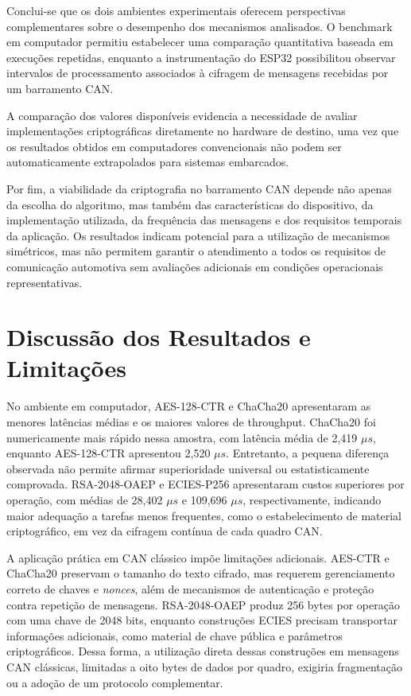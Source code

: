 Conclui-se que os dois ambientes experimentais oferecem perspectivas complementares sobre o desempenho dos mecanismos analisados. O benchmark em computador permitiu estabelecer uma comparação quantitativa baseada em execuções repetidas, enquanto a instrumentação do ESP32 possibilitou observar intervalos de processamento associados à cifragem de mensagens recebidas por um barramento CAN.

A comparação dos valores disponíveis evidencia a necessidade de avaliar implementações criptográficas diretamente no hardware de destino, uma vez que os resultados obtidos em computadores convencionais não podem ser automaticamente extrapolados para sistemas embarcados.

Por fim, a viabilidade da criptografia no barramento CAN depende não apenas da escolha do algoritmo, mas também das características do dispositivo, da implementação utilizada, da frequência das mensagens e dos requisitos temporais da aplicação. Os resultados indicam potencial para a utilização de mecanismos simétricos, mas não permitem garantir o atendimento a todos os requisitos de comunicação automotiva sem avaliações adicionais em condições operacionais representativas.


\section{Discussão dos Resultados e Limitações}

No ambiente em computador, AES-128-CTR e ChaCha20 apresentaram as menores latências médias e os maiores valores de throughput. ChaCha20 foi numericamente mais rápido nessa amostra, com latência média de 2,419 $\mu s$, enquanto AES-128-CTR apresentou 2,520 $\mu s$. Entretanto, a pequena diferença observada não permite afirmar superioridade universal ou estatisticamente comprovada. RSA-2048-OAEP e ECIES-P256 apresentaram custos superiores por operação, com médias de 28,402 $\mu s$ e 109,696 $\mu s$, respectivamente, indicando maior adequação a tarefas menos frequentes, como o estabelecimento de material criptográfico, em vez da cifragem contínua de cada quadro CAN.

A aplicação prática em CAN clássico impõe limitações adicionais. AES-CTR e ChaCha20 preservam o tamanho do texto cifrado, mas requerem gerenciamento correto de chaves e \textit{nonces}, além de mecanismos de autenticação e proteção contra repetição de mensagens. RSA-2048-OAEP produz 256 bytes por operação com uma chave de 2048 bits, enquanto construções ECIES precisam transportar informações adicionais, como material de chave pública e parâmetros criptográficos. Dessa forma, a utilização direta dessas construções em mensagens CAN clássicas, limitadas a oito bytes de dados por quadro, exigiria fragmentação ou a adoção de um protocolo complementar.

